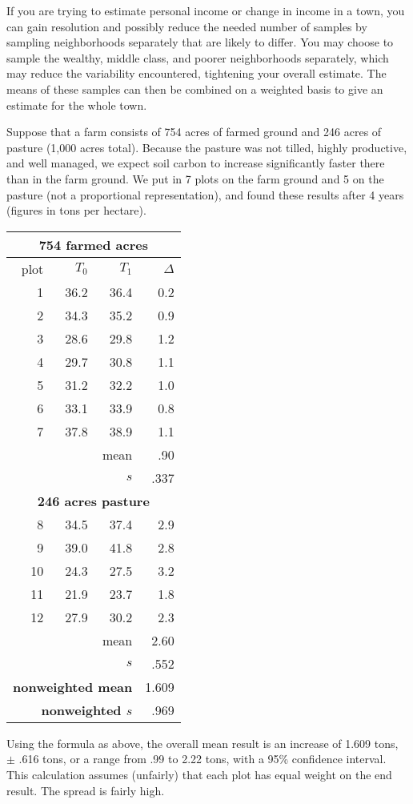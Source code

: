 \documentclass[11pt,letterpaper,oneside,onecolumn]{memoir}
\begin{document}
If you are trying to estimate personal income or change in income in a town, you can gain resolution and possibly reduce the needed number of samples by sampling neighborhoods separately that are likely to differ. You may choose to sample the wealthy, middle class, and poorer neighborhoods separately, which may reduce the variability encountered, tightening your overall estimate. The means of these samples can then be combined on a weighted basis to give an estimate for the whole town.

Suppose that a farm consists of 754 acres of farmed ground and 246 acres of pasture (1,000 acres total). Because the pasture was not tilled, highly productive, and well managed, we expect soil carbon to increase significantly faster there than in the farm ground. We put in 7 plots on the farm ground and 5 on the pasture (not a proportional representation), and found these results after 4 years (figures in tons per hectare).
\small
\begin{center}
\begin{tabular}{|r|r|r|r|}\hline
\multicolumn{4}{|c|}{\textbf{754 farmed acres}}\\ \hline
plot&$T_{0}$&$T_{1}$&$\Delta$\\ \hline
1&36.2&36.4&0.2\\ \hline
2&34.3&35.2&0.9\\ \hline
3&28.6&29.8&1.2\\ \hline
4&29.7&30.8&1.1\\ \hline
5&31.2&32.2&1.0\\ \hline
6&33.1&33.9&0.8\\ \hline
7&37.8&38.9&1.1\\ \hline

\multicolumn{3}{|r|}{mean}&.90\\ \hline
\multicolumn{3}{|r|}{$s$}&.337\\ \hline\hline
\multicolumn{4}{|c|}{\textbf{246 acres pasture}}\\ \hline
8&34.5&37.4&2.9\\ \hline
9&39.0&41.8&2.8\\ \hline
10&24.3&27.5&3.2\\ \hline
11&21.9&23.7&1.8\\ \hline
12&27.9&30.2&2.3\\ \hline
\multicolumn{3}{|r|}{mean}&2.60\\ \hline
\multicolumn{3}{|r|}{$s$}&.552\\ \hline\hline
\multicolumn{3}{|r|}{\textbf{nonweighted mean}}&1.609\\ \hline
\multicolumn{3}{|r|}{\textbf{nonweighted $s$}}&.969\\ \hline
\end{tabular}
\end{center}
\normalsize
Using the formula as above, the overall mean result is an increase of 1.609 tons, $\pm$ .616 tons, or a range from .99 to 2.22 tons, with a 95\% confidence interval. This calculation assumes (unfairly) that each plot has equal weight on the end result. The spread is fairly high.
\end{document}
